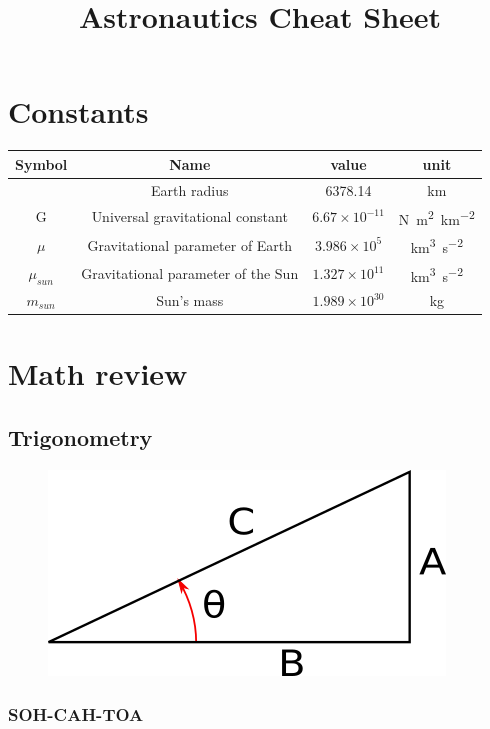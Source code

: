 \documentclass{article}
\title{Astronautics Cheat Sheet}
\begin{document}
\maketitle

\section{Constants}
\begin{center}
	\begin{tabular}{|c | c |  c | c |}
		\hline
		Symbol & Name & value & unit \\ [0.5ex]
		\hline\hline
		& Earth radius & 6378.14 & km \\
		\hline
		G & Universal gravitational constant & $6.67 \times 10^{-11}$ & \si{\newton \meter\squared\per\kilo\meter\squared}\\
		\hline
		$\mu$ & Gravitational parameter of Earth & $3.986 \times 10^{5}$ & \si{\kilo\meter\cubed\per\second\squared} \\
		\hline
		$\mu_{sun}$ & Gravitational parameter of the Sun & $1.327 \times 10^{11}$ & \si{\kilo\meter\cubed\per\second\squared} \\
		\hline
		$m_{sun}$ & Sun's mass & $1.989 \times 10^{30}$ & \si{\kilo\gram} \\
		\hline
	\end{tabular}
\end{center}

\section{Math review}
\subsection{Trigonometry}
	\begin{figure}[H]
		\centering
		\includegraphics[width=0.4\linewidth]{img/trigo_triangle}
		\label{fig:trigo_triangle}
	\end{figure}

\subsubsection*{SOH-CAH-TOA}
\end{document}
